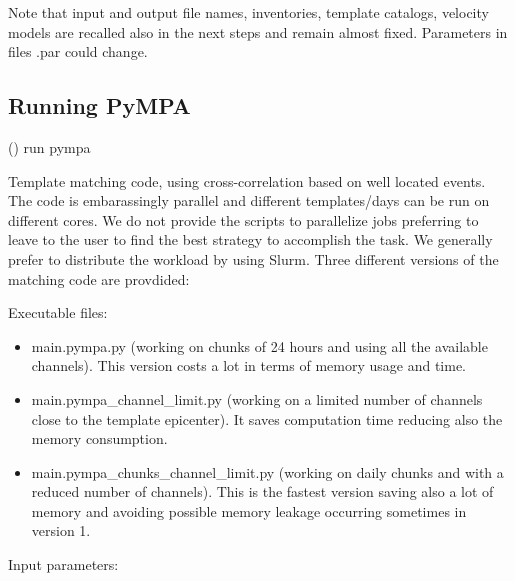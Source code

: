 \documentclass[a4paper,10pt,english]{sphinxmanual}
\begin{document}
Note that input and output file names, inventories, template catalogs, velocity models are recalled also in the next steps and remain almost fixed. Parameters in files .par could change.


\subsection{Running PyMPA}
\label{\detokenize{tutorial:running-pympa}}
({\hyperref[\detokenize{sub/main.pympa_chunks_channel_limit::doc}]{}}) run pympa

Template matching code, using cross-correlation based on well located events. The code is embarassingly parallel and different templates/days can be run on different cores. We do not provide the scripts to parallelize jobs preferring to leave to the user to find the best strategy to accomplish the task. We generally prefer to distribute the workload by using Slurm.
Three different versions of the matching code are provdided:

Executable files:
\begin{itemize}
\item {} 
main.pympa.py (working on chunks of 24 hours and using all the available channels). This version costs a lot in terms of memory usage and time.

\item {} 
main.pympa\_channel\_limit.py (working on a limited number of channels close to the template epicenter). It saves computation time reducing also the memory consumption.

\item {} 
main.pympa\_chunks\_channel\_limit.py (working on daily chunks and with a reduced number of channels). This is the fastest version saving also a lot of memory and avoiding possible memory leakage occurring sometimes in version 1.

\end{itemize}

Input parameters:
\end{document}
